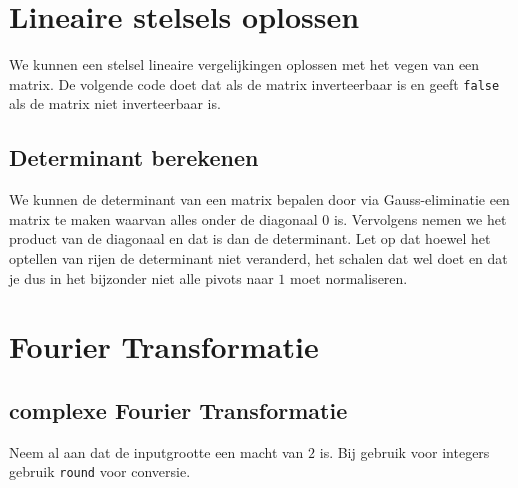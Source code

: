 \documentclass[10pt,a4paper,titlepage]{article}
\begin{document}
\section{Lineaire stelsels oplossen}

We kunnen een stelsel lineaire vergelijkingen oplossen met het vegen van een matrix. De volgende code doet dat als de matrix inverteerbaar is en geeft \texttt{false} als de matrix niet inverteerbaar is.


\iftrue
\subsection{Determinant berekenen}

We kunnen de determinant van een matrix bepalen door via Gauss-eliminatie een matrix te maken waarvan alles onder de diagonaal $0$ is. Vervolgens nemen we het product van de diagonaal en dat is dan de determinant. Let op dat hoewel het optellen van rijen de determinant niet veranderd, het schalen dat wel doet en dat je dus in het bijzonder niet alle pivots naar $1$ moet normaliseren. 
\fi
\iftrue
\section{Fourier Transformatie}

\subsection{complexe Fourier Transformatie}

Neem al aan dat de inputgrootte een macht van $2$ is. Bij gebruik voor integers  gebruik \verb-round- voor conversie.


\fi
\end{document}
